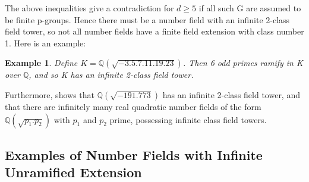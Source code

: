 \documentclass[preprint,12pt,reqno]{elsarticle}
\newtheorem{example}{Example}
\begin{document}
The above inequalities give a contradiction for $d \geq 5$ if all such G are assumed to be finite p-groups. Hence there must be a number field with an infinite 2-class field tower, so not all number fields have a finite field extension with class number 1. Here is an example:
\begin{example}
    Define $K=\mathbb{Q}(\sqrt{-3.5.7.11.19.23})$. Then 6 odd primes ramify in K over $\mathbb{Q}$, and so K has an infinite 2-class field tower. 
\end{example}
Furthermore, \cite{SCHO} shows that $\mathbb{Q}(\sqrt{-191.773})$ has an infinite 2-class field tower, and that there are infinitely many real quadratic number fields of the form $\mathbb{Q}(\sqrt{p_1.p_2})$ with $p_1$ and $p_2$ prime, possessing infinite class field towers. 

\subsection{Examples of Number Fields with Infinite Unramified Extension}
\end{document}
